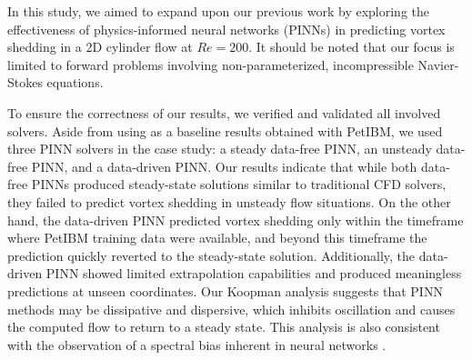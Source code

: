 
In this study, we aimed to expand upon our previous work \cite{chuang_experience_2022} by exploring the effectiveness of physics-informed neural networks (PINNs) in predicting vortex shedding in a 2D cylinder flow at $Re = 200$.
It should be noted that our focus is limited to forward problems involving non-parameterized, incompressible Navier-Stokes equations.

To ensure the correctness of our results, we verified and validated all involved solvers.
Aside from using as a baseline results obtained with PetIBM, we used three PINN solvers in the case study: a steady data-free PINN, an unsteady data-free PINN, and a data-driven PINN.
Our results indicate that while both data-free PINNs produced steady-state solutions similar to traditional CFD solvers, they failed to predict vortex shedding in unsteady flow situations.
On the other hand, the data-driven PINN predicted vortex shedding only within the timeframe where PetIBM training data were available, and beyond this timeframe the prediction quickly reverted to the steady-state solution.
Additionally, the data-driven PINN showed limited extrapolation capabilities and produced meaningless predictions at unseen coordinates.
Our Koopman analysis suggests that PINN methods may be dissipative and dispersive, which inhibits oscillation and causes the computed flow to return to a steady state.
This analysis is also consistent with the observation of a spectral bias inherent in neural networks \cite{rahaman_spectral_2019}.

